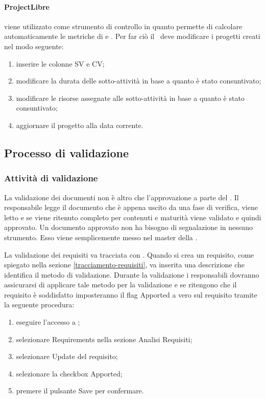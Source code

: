 \documentclass[12pt,a4paper]{article}
\begin{document}
\paragraph{ProjectLibre}
 viene utilizzato come strumento di controllo in quanto permette di calcolare automaticamente le metriche di  e . Per far ciò il \RE\ deve modificare i progetti creati nel modo seguente:
\begin{enumerate}
	\item inserire le colonne SV e CV;
	\item modificare la durata delle sotto-attività in base a quanto è stato consuntivato;
	\item modificare le risorse assegnate alle sotto-attività in base a quanto è stato consuntivato;
	\item aggiornare il progetto alla data corrente.
\end{enumerate}

\subsection{Processo di validazione}

\subsubsection{Attività di validazione}

La validazione dei documenti non è altro che l'approvazione a parte del \RE. Il responsabile legge il documento che è appena uscito da una fase di verifica, viene letto e se viene ritenuto completo per contenuti e maturità viene validato e quindi approvato. Un documento approvato non ha bisogno di segnalazione in nessuno strumento. Esso viene semplicemente messo nel  master della .

La validazione dei requisiti va tracciata con . Quando si crea un requisito, come spiegato nella sezione \ref{tracciamento-requisiti}, va inserita una descrizione che identifica il metodo di validazione. Durante la validazione i responsabili dovranno assicurarsi di applicare tale metodo per la validazione e se ritengono che il requisito è soddisfatto imposteranno il flag Apported a vero sul requisito tramite la seguente procedura:
\begin{enumerate}
	\item eseguire l'accesso a ;
	\item selezionare Requirements nella sezione Analisi Requisiti;
	\item selezionare Update del requisito;
	\item selezionare la checkbox Apported;
	\item premere il pulsante Save per confermare.
\end{enumerate}
\end{document}
